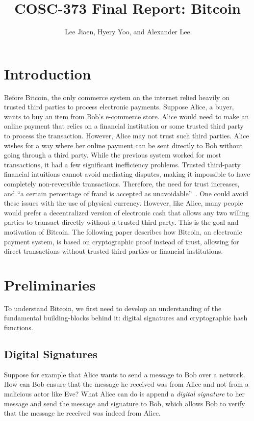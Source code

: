 \documentclass{article}
\title{COSC-373 Final Report: Bitcoin}
\author{Lee Jiaen, Hyery Yoo, and Alexander Lee}
\begin{document}
\maketitle

\section{Introduction}

Before Bitcoin, the only commerce system on the internet relied heavily on
trusted third parties to process electronic payments. Suppose Alice, a buyer,
wants to buy an item from Bob's e-commerce store. Alice would need to make an
online payment that relies on a financial institution or some trusted third
party to process the transaction. However, Alice may not trust such third
parties. Alice wishes for a way where her online payment can be sent directly to
Bob without going through a third party. While the previous system worked for
most transactions, it had a few significant inefficiency problems. Trusted
third-party financial intuitions cannot avoid mediating disputes, making it
impossible to have completely non-reversible transactions. Therefore, the need
for trust increases, and ``a certain percentage of fraud is accepted as
unavoidable''~\citep{Nakamoto08}. One could avoid these issues with the use of
physical currency. However, like Alice, many people would prefer a decentralized
version of electronic cash that allows any two willing parties to transact
directly without a trusted third party. This is the goal and motivation of
Bitcoin. The following paper describes how Bitcoin, an electronic payment
system, is based on cryptographic proof instead of trust, allowing for direct
transactions without trusted third parties or financial institutions.

\section{Preliminaries}

To understand Bitcoin, we first need to develop an understanding of the
fundamental building-blocks behind it: digital signatures and cryptographic hash
functions.

\subsection{Digital Signatures}

Suppose for example that Alice wants to send a message to Bob over a network.
How can Bob ensure that the message he received was from Alice and not from a
malicious actor like Eve? What Alice can do is append a \emph{digital signature}
to her message and send the message and signature to Bob, which allows Bob to
verify that the message he received was indeed from Alice.
\end{document}
